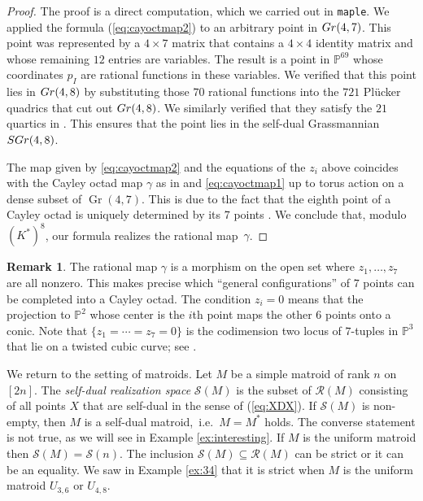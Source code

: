 \documentclass[12pt]{extarticle}
\theoremstyle{definition}
\newtheorem{remark}[theorem]{Remark}
\numberwithin{theorem}{section}
\theoremstyle{plain}\newtheorem{ithm}{Theorem}
\newcommand{\PP}{\mathbb{P}}
\DeclareMathOperator{\Gr}{Gr}
\begin{document}
\begin{proof}
The proof is a direct computation, which we carried out in {\tt maple}.
We applied the formula (\ref{eq:cayoctmap2}) to an arbitrary point in ${\rm Gr}(4,7)$.
This point was represented by a $4 \times 7$ matrix that contains
a $4 \times 4$ identity matrix and whose remaining $12$ entries are variables.
The result is a point in $\PP^{69}$ whose coordinates $p_I$
are rational functions in these variables. We verified that this point lies in
 ${\rm Gr}(4,8)$ by substituting those $70$ rational functions into
 the $721$ Pl\"ucker quadrics that cut out ${\rm Gr}(4,8)$.
 We similarly verified that they satisfy the $21$ quartics
 in \cite[Proposition 7.2]{PSV}. This ensures that the point lies in
 the self-dual Grassmannian  ${\rm SGr}(4,8)$.
 
The map given by \eqref{eq:cayoctmap2} and the equations of the $z_i$ above coincides with the Cayley octad map $\gamma$ as in \cite[Proposition 7.1]{PSV} and \eqref{eq:cayoctmap1}  up to torus action on a dense subset of $\Gr(4,7)$. This is due to the fact that the eighth point of a Cayley octad is uniquely determined by its 7 points \cite{PSV}. 
 We conclude that,
modulo $(K^*)^8$, our formula 
realizes the rational map~$\gamma $.
\end{proof}

\begin{remark}
The rational map $\gamma$ is a morphism on the open set
where $z_1,\ldots,z_7$ are all nonzero. This makes precise which
``general configurations'' of $7$ points can be completed into a Cayley octad. The condition $z_i = 0$ means that the projection 
to $\PP^2$ whose center is the $i$th point maps the
other $6$ points onto a conic.
Note that $\{z_1=\cdots=z_7=0\}$ is the codimension two locus of
 $7$-tuples in $\PP^3$ that lie on a twisted cubic curve; see \cite[Example~2.9]{CS}.
\end{remark}

We return to the  setting of matroids.
Let $M$ be a simple matroid of rank $n$ on $[2n]$.
The {\em self-dual realization space}
$\mathcal{S}(M)$ is the subset of $\mathcal{R}(M)$
consisting of all points $X$ that are self-dual in the sense of
(\ref{eq:XDX}).  If $\mathcal{S}(M)$ is non-empty, then
$M$ is a self-dual matroid,~i.e.~$M = M^*$ holds.
The converse statement is not true, as we will see in
Example \ref{ex:interesting}.
If $M$ is the uniform matroid then
$\mathcal{S}(M)  = \mathcal{S}(n)$.
The inclusion $\mathcal{S}(M) \subseteq \mathcal{R}(M)$ 
can be strict or it can be an equality. 
We saw in Example \ref{ex:34} that it is
strict when $M$ is the uniform matroid $U_{3,6}$ or $U_{4,8}$.
\end{document}
